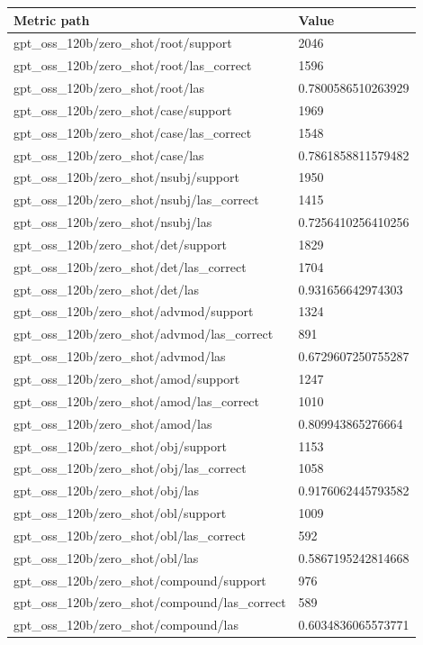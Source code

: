 \begin{tabular}{ll}
\hline
Metric path & Value \\
\hline
gpt\_oss\_120b/zero\_shot/root/support & 2046 \\
gpt\_oss\_120b/zero\_shot/root/las\_correct & 1596 \\
gpt\_oss\_120b/zero\_shot/root/las & 0.7800586510263929 \\
gpt\_oss\_120b/zero\_shot/case/support & 1969 \\
gpt\_oss\_120b/zero\_shot/case/las\_correct & 1548 \\
gpt\_oss\_120b/zero\_shot/case/las & 0.7861858811579482 \\
gpt\_oss\_120b/zero\_shot/nsubj/support & 1950 \\
gpt\_oss\_120b/zero\_shot/nsubj/las\_correct & 1415 \\
gpt\_oss\_120b/zero\_shot/nsubj/las & 0.7256410256410256 \\
gpt\_oss\_120b/zero\_shot/det/support & 1829 \\
gpt\_oss\_120b/zero\_shot/det/las\_correct & 1704 \\
gpt\_oss\_120b/zero\_shot/det/las & 0.931656642974303 \\
gpt\_oss\_120b/zero\_shot/advmod/support & 1324 \\
gpt\_oss\_120b/zero\_shot/advmod/las\_correct & 891 \\
gpt\_oss\_120b/zero\_shot/advmod/las & 0.6729607250755287 \\
gpt\_oss\_120b/zero\_shot/amod/support & 1247 \\
gpt\_oss\_120b/zero\_shot/amod/las\_correct & 1010 \\
gpt\_oss\_120b/zero\_shot/amod/las & 0.809943865276664 \\
gpt\_oss\_120b/zero\_shot/obj/support & 1153 \\
gpt\_oss\_120b/zero\_shot/obj/las\_correct & 1058 \\
gpt\_oss\_120b/zero\_shot/obj/las & 0.9176062445793582 \\
gpt\_oss\_120b/zero\_shot/obl/support & 1009 \\
gpt\_oss\_120b/zero\_shot/obl/las\_correct & 592 \\
gpt\_oss\_120b/zero\_shot/obl/las & 0.5867195242814668 \\
gpt\_oss\_120b/zero\_shot/compound/support & 976 \\
gpt\_oss\_120b/zero\_shot/compound/las\_correct & 589 \\
gpt\_oss\_120b/zero\_shot/compound/las & 0.6034836065573771 \\

\end{tabular}
